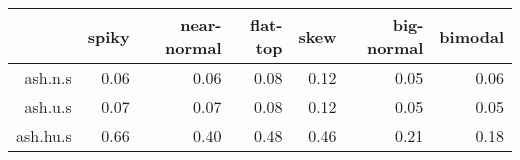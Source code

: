 \begin{tabular}{rrrrrrr}
  \toprule  & spiky & near-normal & flat-top & skew & big-normal & bimodal \\ 
  \midrule ash.n.s & 0.06 & 0.06 & 0.08 & 0.12 & 0.05 & 0.06 \\ 
  ash.u.s & 0.07 & 0.07 & 0.08 & 0.12 & 0.05 & 0.05 \\ 
  ash.hu.s & 0.66 & 0.40 & 0.48 & 0.46 & 0.21 & 0.18 \\ 
   \bottomrule \end{tabular}

